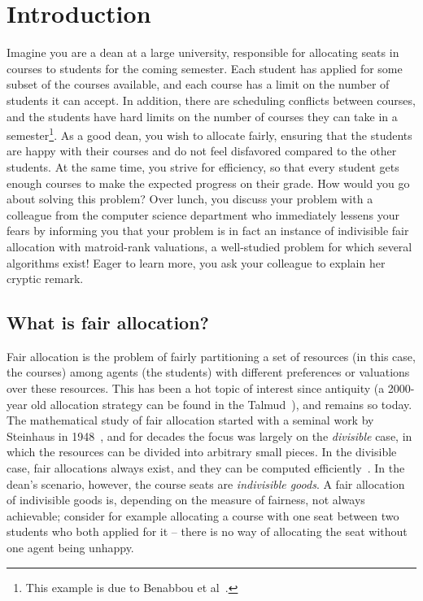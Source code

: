 \chapter{Introduction}

Imagine you are a dean at a large university, responsible for allocating seats in courses to students for the coming semester. Each student has applied for some subset of the courses available, and each course has a limit on the number of students it can accept. In addition, there are scheduling conflicts between courses, and the students have hard limits on the number of courses they can take in a semester\footnote{This example is due to Benabbou et al~\cite{Benabbou_2020}.}. As a good dean, you wish to allocate fairly, ensuring that the students are happy with their courses and do not feel disfavored compared to the other students. At the same time, you strive for efficiency, so that every student gets enough courses to make the expected progress on their grade. How would you go about solving this problem? Over lunch, you discuss your problem with a colleague from the computer science department who immediately lessens your fears by informing you that your problem is in fact an instance of indivisible fair allocation with matroid-rank valuations, a well-studied problem for which several algorithms exist! Eager to learn more, you ask your colleague to explain her cryptic remark.

\section*{What is fair allocation?}
Fair allocation is the problem of fairly partitioning a set of resources (in this case, the courses) among agents (the students) with different preferences or valuations over these resources. This has been a hot topic of interest since antiquity (a 2000-year old allocation strategy can be found in the Talmud~\cite{aumann-1985}), and remains so today. The mathematical study of fair allocation started with a seminal work by Steinhaus in 1948~\cite{steinhaus-1948}, and for decades the focus was largely on the \textit{divisible} case, in which the resources can be divided into arbitrary small pieces. In the divisible case, fair allocations always exist, and they can be computed efficiently~\cite{amanatidis2022fair}. In the dean's scenario, however, the course seats are \textit{indivisible goods}. A fair allocation of indivisible goods is, depending on the measure of fairness, not always achievable; consider for example allocating a course with one seat between two students who both applied for it -- there is no way of allocating the seat without one agent being unhappy.

